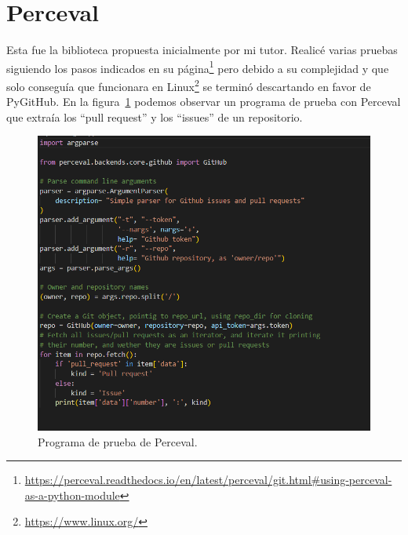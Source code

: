 \documentclass[a4paper, 12pt]{book}
\begin{document}
\section{Perceval}
Esta fue la biblioteca propuesta inicialmente por mi tutor. Realicé varias pruebas siguiendo los pasos indicados en su página\footnote{\url{https://perceval.readthedocs.io/en/latest/perceval/git.html#using-perceval-as-a-python-module}} pero debido a su complejidad y que solo conseguía que funcionara en Linux\footnote{\url{https://www.linux.org/}} se terminó descartando en favor de PyGitHub. En la figura~\ref{fig:perceval} podemos observar un programa de prueba con Perceval que extraía los ``pull request'' y los ``issues'' de un repositorio.
\begin{figure}
    \centering
    \includegraphics[width=1\textwidth, keepaspectratio]{img/perceval.png}
    \caption{Programa de prueba de Perceval.}\label{fig:perceval}
\end{figure}
\end{document}

